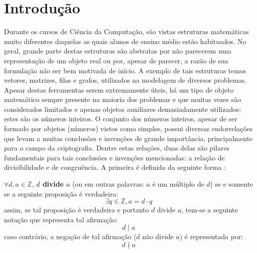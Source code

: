 \chapter[Introdução]{Introdução}

\label{chap:intro}

Durante os cursos de Ciência da Computação, são vistas estruturas matemáticas muito diferentes daquelas as quais alunos de ensino médio estão habituados. No geral, grande parte destas estruturas são abstratas por não parecerem uma representação de um objeto real ou por, apesar de parecer, a razão de sua formulação não ser bem motivada de início. A exemplo de tais estruturas temos vetores, matrizes, filas e grafos, utilizados na modelagem de diversos problemas. Apesar destas ferramentas serem extremamente úteis, há um tipo de objeto matemático sempre presente na maioria dos problemas e que muitas vezes são considerados limitados e apenas objetos auxiliares demasiadamente utilizados: estes são os números inteiros. O conjunto dos números inteiros, apesar de ser formado por objetos (números) vistos como simples, possui diversas endorrelações que levam a muitas conclusões e invenções de grande importância, principalmente para o campo da criptografia. Dentre estas relações, duas delas são pilares fundamentais para tais conclusões e invenções mencionadas: a relação de divisibilidade e de congruência. A primeira é definida da seguinte forma \cite{book:2399854}:
\\
\begin{definição}
        $\forall d, a \in \mathbb{Z}$, \textbf{$d$ divide $a$} (ou em outras palavras: $a$ é um múltiplo de $d$) se e somente se a seguinte proposição é verdadeira:
    \begin{equation*}
        \exists q \in \mathbb{Z}, a = d \cdot q
    \end{equation*}
    assim, se tal proposição é verdadeira e portanto $d$ divide $a$, tem-se a seguinte notação que representa tal afirmação:
    \begin{equation*}
        d \mid a
    \end{equation*}
    caso contrário, a negação de tal afirmação ($d$ não divide $a$) é representada por:
    \begin{equation*}
        d \nmid a
    \end{equation*}
\end{definição}

